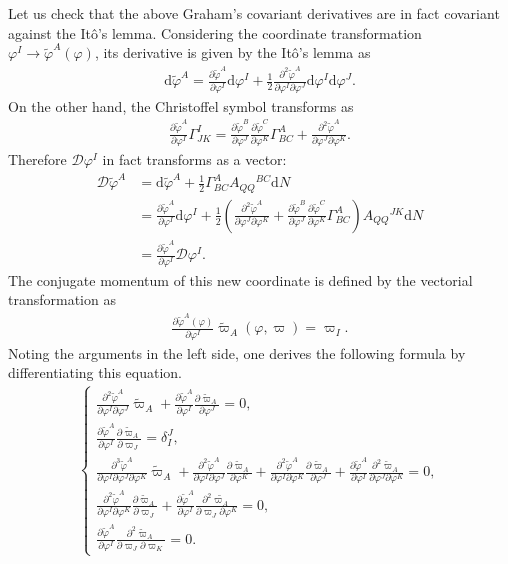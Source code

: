 \documentclass[aps, prd
, preprint
, nofootinbib 
, longbibliography
]{revtex4-1}
\newcommand{\pdif}[2]{\frac{\partial #1}{\partial #2}}
\newcommand{\ppdpdpd}[3]{\frac{\partial^2 #1}{\partial #2\partial #3}}
\newcommand{\pppdpdpdpd}[4]{\frac{\partial^3 #1}{\partial #2\partial #3\partial #4}}
\newcommand{\dd}{\mathrm{d}}
\newcommand{\dps}{\displaystyle}
\newcommand{\calD}{\mathcal{D}}
\newcommand{\bae}[1]{\begin{align} #1 \end{align}}
\newcommand{\bce}[1]{\begin{cases} #1 \end{cases}}
\begin{document}
Let us check that the above Graham's covariant derivatives are in fact covariant against the It\^o's lemma.
Considering the coordinate transformation $\varphi^I\to\tilde{\varphi}^A(\varphi)$, its derivative is given by the It\^o's lemma as
\bae{
	\dd\tilde{\varphi}^A=\pdif{\tilde{\varphi}^A}{\varphi^I}\dd\varphi^I+\frac{1}{2}\frac{\partial^2\tilde{\varphi}^A}{\partial\varphi^I\partial\varphi^J}\dd\varphi^I\dd\varphi^J.
}
On the other hand, the Christoffel symbol transforms as
\bae{\label{eq: christoffel trs.}
	\pdif{\tilde{\varphi}^A}{\varphi^I}\Gamma^I_{JK}=\pdif{\tilde{\varphi}^B}{\varphi^J}\pdif{\tilde{\varphi}^C}{\varphi^K}\Gamma^A_{BC}
	+\frac{\partial^2\tilde{\varphi}^A}{\partial\varphi^J\partial\varphi^K}.
}
Therefore $\calD\varphi^I$ in fact transforms as a vector:
\bae{
	\calD\tilde{\varphi}^A&=\dd\tilde{\varphi}^A+\frac{1}{2}\Gamma^A_{BC}A_{QQ}{}^{BC}\dd N \nonumber \\
	&=\pdif{\tilde{\varphi}^A}{\varphi^I}\dd\varphi^I+\frac{1}{2}\left(\frac{\partial^2\tilde{\varphi}^A}{\partial\varphi^J\partial\varphi^K}
	+\pdif{\tilde{\varphi}^B}{\varphi^J}\pdif{\tilde{\varphi}^C}{\varphi^K}\Gamma^A_{BC}\right)A_{QQ}{}^{JK}\dd N \nonumber \\
	&=\pdif{\tilde{\varphi}^A}{\varphi^I}\calD\varphi^I.
}
The conjugate momentum of this new coordinate is defined by the vectorial transformation as
\bae{
	\pdif{\tilde{\varphi}^A(\varphi)}{\varphi^I}\tilde{\varpi}_A(\varphi,\varpi)=\varpi_I.
}
Noting the arguments in the left side, one derives the following formula by differentiating this equation.
\bae{
	\bce{
		\dps
		\ppdpdpd{\tilde{\varphi}^A}{\varphi^I}{\varphi^J}\tilde{\varpi}_A+\pdif{\tilde{\varphi}^A}{\varphi^I}\pdif{\tilde{\varpi}_A}{\varphi^J}=0, \\[10pt]
		\dps
		\pdif{\tilde{\varphi}^A}{\varphi^I}\pdif{\tilde{\varpi}_A}{\varpi_J}=\delta^J_I, \\[10pt]
		\dps
		\pppdpdpdpd{\tilde{\varphi}^A}{\varphi^I}{\varphi^J}{\varphi^K}\tilde{\varpi}_A+\ppdpdpd{\tilde{\varphi}^A}{\varphi^I}{\varphi^J}\pdif{\tilde{\varpi}_A}{\varphi^K}
		+\ppdpdpd{\tilde{\varphi}^A}{\varphi^I}{\varphi^K}\pdif{\tilde{\varpi}_A}{\varphi^J}+\pdif{\tilde{\varphi}^A}{\varphi^I}\ppdpdpd{\tilde{\varpi}_A}{\varphi^J}{\varphi^K}=0, \\[10pt]
		\dps
		\ppdpdpd{\tilde{\varphi}^A}{\varphi^I}{\varphi^K}\pdif{\tilde{\varpi}_A}{\varpi_J}+\pdif{\tilde{\varphi}^A}{\varphi^I}\ppdpdpd{\tilde{\varpi_A}}{\varpi_J}{\varphi^K}=0, \\[10pt]
		\dps
		\pdif{\tilde{\varphi}^A}{\varphi^I}\ppdpdpd{\tilde{\varpi}_A}{\varpi_J}{\varpi_K}=0.
	}
}
\end{document}
